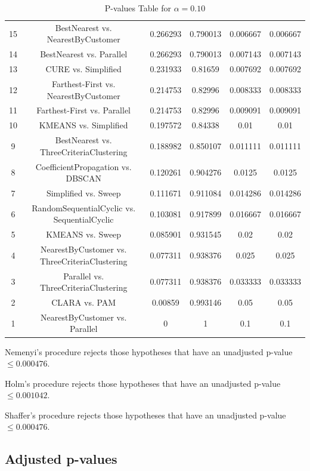 \documentclass[a4paper,10pt]{article}
\begin{document}
\begin{landscape}
\begin{table}[!htp]
\begin{tabular}{cccccc}
15&BestNearest vs. NearestByCustomer&0.266293&0.790013&0.006667&0.006667\\
14&BestNearest vs. Parallel&0.266293&0.790013&0.007143&0.007143\\
13&CURE vs. Simplified&0.231933&0.81659&0.007692&0.007692\\
12&Farthest-First vs. NearestByCustomer&0.214753&0.82996&0.008333&0.008333\\
11&Farthest-First vs. Parallel&0.214753&0.82996&0.009091&0.009091\\
10&KMEANS vs. Simplified&0.197572&0.84338&0.01&0.01\\
9&BestNearest vs. ThreeCriteriaClustering&0.188982&0.850107&0.011111&0.011111\\
8&CoefficientPropagation vs. DBSCAN&0.120261&0.904276&0.0125&0.0125\\
7&Simplified vs. Sweep&0.111671&0.911084&0.014286&0.014286\\
6&RandomSequentialCyclic vs. SequentialCyclic&0.103081&0.917899&0.016667&0.016667\\
5&KMEANS vs. Sweep&0.085901&0.931545&0.02&0.02\\
4&NearestByCustomer vs. ThreeCriteriaClustering&0.077311&0.938376&0.025&0.025\\
3&Parallel vs. ThreeCriteriaClustering&0.077311&0.938376&0.033333&0.033333\\
2&CLARA vs. PAM&0.00859&0.993146&0.05&0.05\\
1&NearestByCustomer vs. Parallel&0&1&0.1&0.1\\
\hline
\end{tabular}
\caption{P-values Table for $\alpha=0.10$}
\end{table}Nemenyi's procedure rejects those hypotheses that have an unadjusted p-value $\le0.000476$.

Holm's procedure rejects those hypotheses that have an unadjusted p-value $\le0.001042$.

Shaffer's procedure rejects those hypotheses that have an unadjusted p-value $\le0.000476$.

\pagebreak

\subsection{Adjusted p-values}


\end{landscape}
\end{document}
